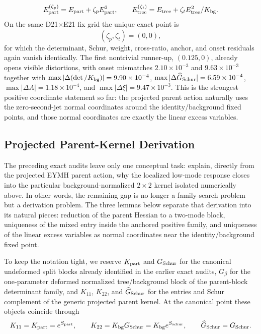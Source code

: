 \documentclass[aps,prd,onecolumn,notitlepage,nofootinbib,superscriptaddress,11pt,floatfix]{revtex4-2}
\begin{document}
\[
E_{\rm part}^{(\zeta_p)}=E_{\rm part}+\zeta_p E_{\rm part}^2,
\qquad
E_{\rm tree}^{(\zeta_t)}=E_{\rm tree}+\zeta_t E_{\rm tree}^2/K_{\rm bg}.
\]
On the same D21$\times$E21 fix grid the unique exact point is
\[
(\zeta_p,\zeta_t)=(0,0),
\]
for which the determinant, Schur, weight, cross-ratio, anchor, and onset residuals again vanish identically. The first nontrivial runner-up, $(0.125,0)$, already opens visible distortions, with onset mismatches $2.10\times10^{-3}$ and $9.63\times10^{-3}$ together with $\max|\Delta(\det/K_{\rm bg})|=9.90\times10^{-4}$, $\max|\Delta \widehat G_{\rm Schur}|=6.59\times10^{-4}$, $\max|\Delta A|=1.18\times10^{-4}$, and $\max|\Delta \xi|=9.47\times10^{-3}$. This is the strongest positive coordinate statement so far: the projected parent action naturally uses the zero-second-jet normal coordinates around the identity/background fixed points, and those normal coordinates are exactly the linear excess variables.
\subsection{Projected Parent-Kernel Derivation}
\label{sec:eymh_parent_kernel_roadmap}

The preceding exact audits leave only one conceptual task: explain, directly from the projected EYMH parent action, why the localized low-mode response closes into the particular background-normalized \(2\times2\) kernel isolated numerically above. In other words, the remaining gap is no longer a family-search problem but a derivation problem. The three lemmas below separate that derivation into its natural pieces: reduction of the parent Hessian to a two-mode block, uniqueness of the mixed entry inside the anchored positive family, and uniqueness of the linear excess variables as normal coordinates near the identity/background fixed point.

To keep the notation tight, we reserve \(K_{\rm part}\) and \(G_{\rm Schur}\) for the canonical undeformed split blocks already identified in the earlier exact audits, \(G_\beta\) for the one-parameter deformed normalized tree/background block of the parent-block determinant family, and \(K_{11}\), \(K_{22}\), and \(\widehat G_{\rm Schur}\) for the entries and Schur complement of the generic projected parent kernel. At the canonical point these objects coincide through
\[
K_{11}=K_{\rm part}=e^{S_{\rm part}},
\qquad
K_{22}=K_{\rm bg}G_{\rm Schur}=K_{\rm bg}e^{S_{\rm schur}},
\qquad
\widehat G_{\rm Schur}=G_{\rm Schur}.
\]
\end{document}
